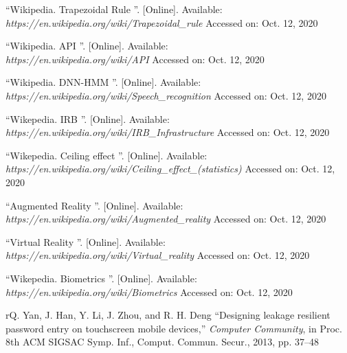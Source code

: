 \documentclass{beamer}
\begin{document}
\begin{frame}[allowframebreaks]
\begin{enumerate}
 	 {{\textquotedblleft Wikipedia. Trapezoidal Rule \textquotedblright}. [Online]. Available:\\ \textit{https://en.wikipedia.org/wiki/Trapezoidal\_rule}   Accessed  on: Oct. 12, 2020}

 	 {{\textquotedblleft Wikipedia. API \textquotedblright}. [Online]. Available:\\ \textit{https://en.wikipedia.org/wiki/API}    Accessed  on: Oct. 12, 2020}




 	 {{\textquotedblleft Wikipedia. DNN-HMM \textquotedblright}. [Online]. Available:\\ \textit{https://en.wikipedia.org/wiki/Speech\_recognition} Accessed on: Oct. 12, 2020}

 	 {{\textquotedblleft Wikepedia. IRB \textquotedblright}. [Online]. Available:\\ \textit{https://en.wikipedia.org/wiki/IRB\_Infrastructure} Accessed on: Oct. 12, 2020}


 	 {{\textquotedblleft Wikepedia. Ceiling effect \textquotedblright}. [Online]. Available:\\ \textit{https://en.wikipedia.org/wiki/Ceiling\_effect\_(statistics)}   Accessed on: Oct. 12, 2020}

 	 {{\textquotedblleft Augmented Reality \textquotedblright}. [Online]. Available:\\ \textit{https://en.wikipedia.org/wiki/Augmented\_reality}  Accessed on: Oct. 12, 2020}

 	 {{\textquotedblleft Virtual Reality \textquotedblright}. [Online]. Available:\\ \textit{https://en.wikipedia.org/wiki/Virtual\_reality}  Accessed on: Oct. 12, 2020}

 	 {{\textquotedblleft Wikepedia. Biometrics \textquotedblright}. [Online]. Available:\\ \textit{https://en.wikipedia.org/wiki/Biometrics} Accessed on: Oct. 12, 2020}

\bibitem{}r{Q. Yan, J. Han, Y. Li, J. Zhou, and R. H. Deng \textquotedblleft Designing leakage resilient password entry on touchscreen mobile devices,” \textit{ Computer Community}, in Proc. 8th ACM SIGSAC Symp. Inf., Comput. Commun. Secur., 2013, pp. 37–48  }



\end{enumerate}

\end{frame}
\end{document}
